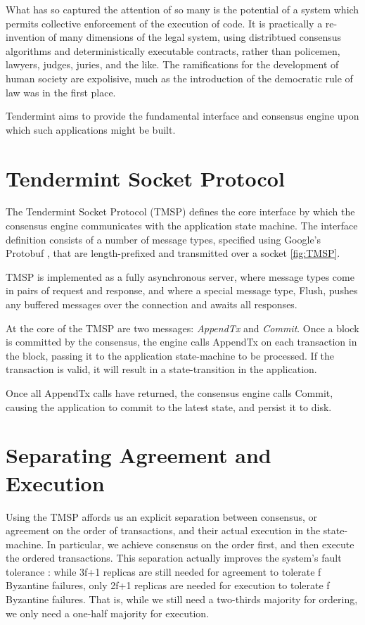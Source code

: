 What has so captured the attention of so many is the potential of a system which permits collective enforcement of the execution of code.
It is practically a re-invention of many dimensions of the legal system, using distribtued consensus algorithms and deterministically executable contracts,
rather than policemen, lawyers, judges, juries, and the like.
The ramifications for the development of human society are expolisive, much as the introduction of the democratic rule of law was in the first place.

Tendermint aims to provide the fundamental interface and consensus engine upon which such applications might be built.

\section{Tendermint Socket Protocol}

The Tendermint Socket Protocol (TMSP) defines the core interface by which the consensus engine communicates with the application state machine.
The interface definition consists of a number of message types, specified using Google's Protobuf \cite{protobuf}, 
that are length-prefixed and transmitted over a socket \ref{fig:TMSP}.

TMSP is implemented as a fully asynchronous server, 
where message types come in pairs of request and response,
and where a special message type, Flush, pushes any buffered messages over the connection and awaits all responses.

At the core of the TMSP are two messages: \emph{AppendTx} and \emph{Commit}.
Once a block is committed by the consensus, 
the engine calls AppendTx on each transaction in the block, 
passing it to the application state-machine to be processed.
If the transaction is valid, it will result in a state-transition in the application.

Once all AppendTx calls have returned, the consensus engine calls Commit,
causing the application to commit to the latest state, and persist it to disk.

\section{Separating Agreement and Execution}

Using the TMSP affords us an explicit separation between consensus, or agreement on the order of transactions, 
and their actual execution in the state-machine.
In particular, we achieve consensus on the order first, and then execute the ordered transactions.
This separation actually improves the system's fault tolerance \cite{yin2003separating}:
while 3f+1 replicas are still needed for agreement to tolerate f Byzantine failures, 
only 2f+1 replicas are needed for execution to tolerate f Byzantine failures.
That is, while we still need a two-thirds majority for ordering, we only need a one-half majority for execution.

